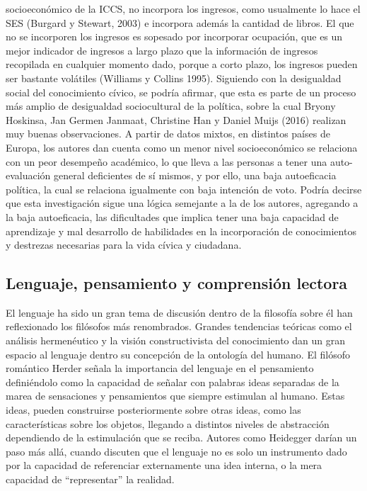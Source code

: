 \documentclass[
]{article}
\begin{document}
socioeconómico de la ICCS, no incorpora los ingresos, como usualmente lo
hace el SES (Burgard y Stewart, 2003) e incorpora además la cantidad de
libros. El que no se incorporen los ingresos es sopesado por incorporar
ocupación, que es un mejor indicador de ingresos a largo plazo que la
información de ingresos recopilada en cualquier momento dado, porque a
corto plazo, los ingresos pueden ser bastante volátiles (Williams y
Collins 1995). Siguiendo con la desigualdad social del conocimiento
cívico, se podría afirmar, que esta es parte de un proceso más amplio de
desigualdad sociocultural de la política, sobre la cual Bryony Hoskinsa,
Jan Germen Janmaat, Christine Han y Daniel Muijs (2016) realizan muy
buenas observaciones. A partir de datos mixtos, en distintos países de
Europa, los autores dan cuenta como un menor nivel socioeconómico se
relaciona con un peor desempeño académico, lo que lleva a las personas a
tener una auto-evaluación general deficientes de sí mismos, y por ello,
una baja autoeficacia política, la cual se relaciona igualmente con baja
intención de voto. Podría decirse que esta investigación sigue una
lógica semejante a la de los autores, agregando a la baja autoeficacia,
las dificultades que implica tener una baja capacidad de aprendizaje y
mal desarrollo de habilidades en la incorporación de conocimientos y
destrezas necesarias para la vida cívica y ciudadana.

\hypertarget{lenguaje-pensamiento-y-comprensiuxf3n-lectora}{%
\subsection{Lenguaje, pensamiento y comprensión
lectora}\label{lenguaje-pensamiento-y-comprensiuxf3n-lectora}}

El lenguaje ha sido un gran tema de discusión dentro de la filosofía
sobre él han reflexionado los filósofos más renombrados. Grandes
tendencias teóricas como el análisis hermenéutico y la visión
constructivista del conocimiento dan un gran espacio al lenguaje dentro
su concepción de la ontología del humano. El filósofo romántico Herder
señala la importancia del lenguaje en el pensamiento definiéndolo como
la capacidad de señalar con palabras ideas separadas de la marea de
sensaciones y pensamientos que siempre estimulan al humano. Estas ideas,
pueden construirse posteriormente sobre otras ideas, como las
características sobre los objetos, llegando a distintos niveles de
abstracción dependiendo de la estimulación que se reciba. Autores como
Heidegger darían un paso más allá, cuando discuten que el lenguaje no es
solo un instrumento dado por la capacidad de referenciar externamente
una idea interna, o la mera capacidad de ``representar'' la realidad.
\end{document}

